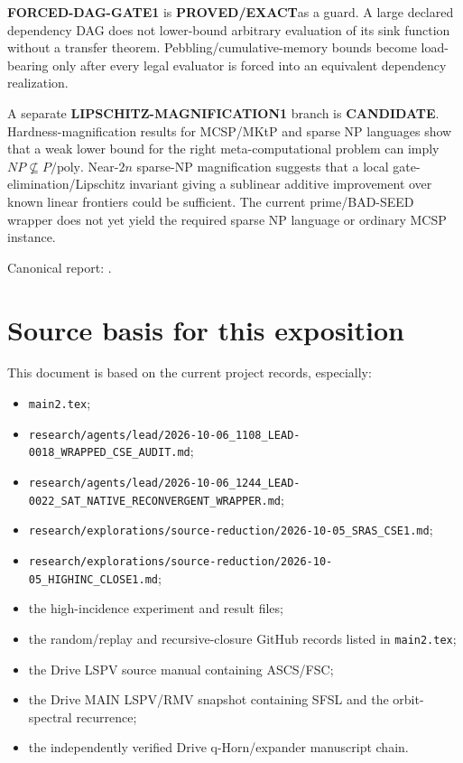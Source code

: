 \documentclass[11pt]{article}
\newcommand{\statusproved}{\textcolor{proved}{\textbf{PROVED/EXACT}}}
\newcommand{\statuscandidate}{\textcolor{candidate}{\textbf{CANDIDATE}}}
\theoremstyle{plain}
\theoremstyle{definition}
\theoremstyle{remark}
\begin{document}
\textbf{FORCED-DAG-GATE1} is \statusproved as a guard. A large declared
dependency DAG does not lower-bound arbitrary evaluation of its sink function
without a transfer theorem. Pebbling/cumulative-memory bounds become
load-bearing only after every legal evaluator is forced into an equivalent
dependency realization.

A separate \textbf{LIPSCHITZ-MAGNIFICATION1} branch is \statuscandidate.
Hardness-magnification results for MCSP/MKtP and sparse NP languages show that
a weak lower bound for the right meta-computational problem can imply
\(NP\not\subseteq P/\mathrm{poly}\). Near-\(2n\) sparse-NP magnification
suggests that a local gate-elimination/Lipschitz invariant giving a sublinear
additive improvement over known linear frontiers could be sufficient. The
current prime/BAD-SEED wrapper does not yet yield the required sparse NP
language or ordinary MCSP instance.

Canonical report:
.


\section{Source basis for this exposition}

This document is based on the current project records, especially:

\begin{itemize}[leftmargin=1.4em]
\item \texttt{main2.tex};
\item \texttt{research/agents/lead/2026-10-06\_1108\_LEAD-0018\_WRAPPED\_CSE\_AUDIT.md};
\item \texttt{research/agents/lead/2026-10-06\_1244\_LEAD-0022\_SAT\_NATIVE\_RECONVERGENT\_WRAPPER.md};
\item \texttt{research/explorations/source-reduction/2026-10-05\_SRAS\_CSE1.md};
\item \texttt{research/explorations/source-reduction/2026-10-05\_HIGHINC\_CLOSE1.md};
\item the high-incidence experiment and result files;
\item the random/replay and recursive-closure GitHub records listed in
\texttt{main2.tex};
\item the Drive LSPV source manual containing ASCS/FSC;
\item the Drive MAIN LSPV/RMV snapshot containing SFSL and the orbit-spectral
recurrence;
\item the independently verified Drive q-Horn/expander manuscript chain.
\end{itemize}
\end{document}

